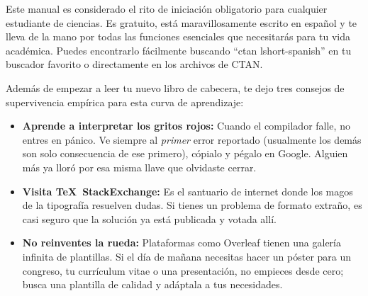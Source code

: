 Este manual es considerado el rito de iniciación obligatorio para cualquier estudiante de ciencias.
Es gratuito, está maravillosamente escrito en español y te lleva de la mano por todas las funciones esenciales que necesitarás para tu vida académica.
Puedes encontrarlo fácilmente buscando “ctan lshort-spanish” en tu buscador favorito o directamente en los archivos de CTAN.

Además de empezar a leer tu nuevo libro de cabecera, te dejo tres consejos de supervivencia empírica para esta curva de aprendizaje:

\begin{itemize}
	\item \textbf{Aprende a interpretar los gritos rojos:} Cuando el compilador falle, no entres en pánico.
	      Ve siempre al \emph{primer} error reportado (usualmente los demás son solo consecuencia de ese primero), cópialo y pégalo en Google.
	      Alguien más ya lloró por esa misma llave que olvidaste cerrar.

	\item \textbf{Visita \TeX\ StackExchange:} Es el santuario de internet donde los magos de la tipografía resuelven dudas.
	      Si tienes un problema de formato extraño, es casi seguro que la solución ya está publicada y votada allí.

	\item \textbf{No reinventes la rueda:} Plataformas como Overleaf tienen una galería infinita de plantillas.
	      Si el día de mañana necesitas hacer un póster para un congreso, tu currículum vitae o una presentación, no empieces desde cero; busca una plantilla de calidad y adáptala a tus necesidades.
\end{itemize}
